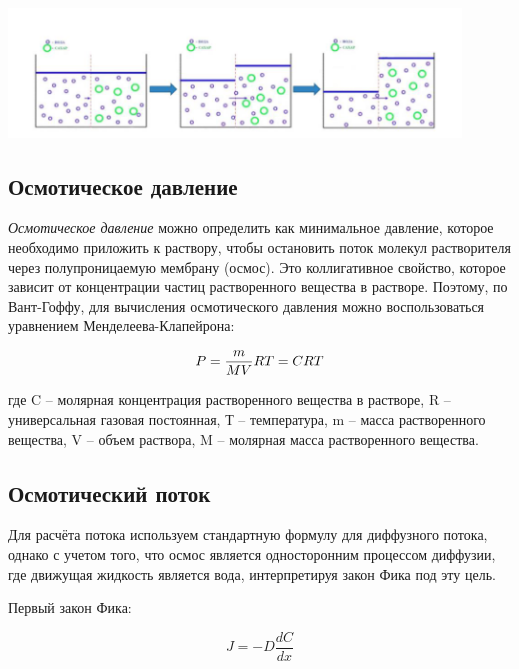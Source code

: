 \documentclass{article}
\begin{document}
            \includegraphics[width=0.9\textwidth]{Osmos.png}
        
        \newpage
        \subsection*{Осмотическое давление}
            \hspace*{4mm}\textit{Осмотическое давление} можно определить как минимальное давление, которое необходимо
            приложить к раствору, чтобы остановить поток молекул растворителя через
            полупроницаемую мембрану (осмос). Это коллигативное свойство, которое
            зависит от концентрации частиц растворенного вещества в растворе. Поэтому, по
            Вант-Гоффу, для вычисления осмотического давления можно воспользоваться
            уравнением Менделеева-Клапейрона:

            \begin{equation}
                P = \frac{m}{MV} \* RT = CRT    
            \end{equation}
            
            где C – молярная концентрация растворенного вещества в растворе, R –
            универсальная газовая постоянная, Т – температура, m – масса растворенного
            вещества, V – объем раствора, M – молярная масса растворенного вещества.

        \subsection*{Осмотический поток}
            \hspace*{4mm}Для расчёта потока используем стандартную формулу для диффузного потока, однако с учетом того, что осмос
            является односторонним процессом диффузии, где движущая жидкость является
            вода, интерпретируя закон Фика под эту цель. \\

            \begin{center}
                Первый закон Фика:

                \begin{equation}
                    J = -D\frac{dC}{dx}    
                \end{equation}
            \end{center}
            
\end{document}
